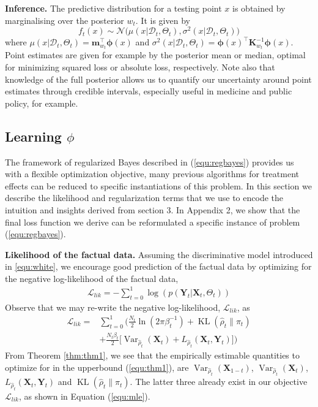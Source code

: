 \documentclass[twoside]{article}
\newcommand{\Var}{\mathop{\mathrm{Var}}}
\newcommand{\KL}{\mathop{\mathrm{KL}}}
\begin{document}
\textbf{Inference.} The predictive distribution for a testing point $x$ is obtained by marginalising over the posterior $w_t$. It is given by
\begin{equation}\label{equ:pred_p1}
f_t(x) \sim \mathcal{N}\big(\mu(x|\mathcal{D}_t,\Theta_t),\sigma^2(x|\mathcal{D}_t,\Theta_t)\big)	
\end{equation}
where $\mu(x|\mathcal{D}_t,\Theta_t)=\mathbf{m}_{w_t}^{\top}\mathbf{\phi}(x)$ and $\sigma^2(x|\mathcal{D}_t,\Theta_t) = \mathbf{\phi}(x)^{\top} \mathbf{K}_{w_t}^{-1}\mathbf{\phi}(x)$. Point estimates are given for example by the posterior mean or median, optimal for minimizing squared loss or absolute loss, respectively. Note also that knowledge of the full posterior allows us to quantify our uncertainty around point estimates through credible intervals, especially useful in medicine and public policy, for example.
\subsection{Learning $\phi$}
The framework of regularized Bayes described in (\ref{equ:regbayes}) provides us with a flexible optimization objective, many previous algorithms for treatment effects can be reduced to specific instantiations of this problem. In this section we describe the likelihood and regularization terms that we use to encode the intuition and insights derived from section 3. In Appendix 2, we show that the final loss function we derive can be reformulated a specific instance of problem (\ref{equ:regbayes}).

\textbf{Likelihood of the factual data.} Assuming the discriminative model introduced in \ref{equ:white}, we encourage good prediction of the factual data by optimizing for the negative log-likelihood of the factual data,
\begin{align}
\mathcal L_{lik} = -\sum_{t=0}^1 \log(p(\mathbf{Y}_t|\mathbf{X}_t,\Theta_t))
\end{align}
Observe that we may re-write the negative log-likelihood, $\mathcal L_{lik}$, as
\begin{align}\label{equ:mle}
  \mathcal{L}_{lik} = & \sum_{t=0}^1 \Big( \frac{N_t}{2}\ln(2\pi\beta_t^{-1})+
  \KL(\hat{\rho}_t\|\pi_t) \nonumber \\ 
  & +\frac{N_t\beta_t}{2}\big[{\Var}_{\hat{\rho}_t}(\mathbf{X}_{t})+L_{\hat{\rho}_t} (\mathbf{X}_t,\mathbf{Y}_t)\big] \Big) 
\end{align}
From Theorem \ref{thm:thm1}, we see that the empirically estimable quantities to optimize for in the upperbound (\ref{equ:thm1}), are ${\Var}_{\hat{\rho}_t}(\mathbf{X}_{1-t})$, ${\Var}_{\hat{\rho}_t}(\mathbf{X}_{t})$, $L_{\hat{\rho}_t} (\mathbf{X}_t,\mathbf{Y}_t)$ and $\KL(\hat{\rho}_t\|\pi_t)$. The latter three already exist in our objective $\mathcal{L}_{lik}$, as shown in Equation (\ref{equ:mle}). 
\end{document}
